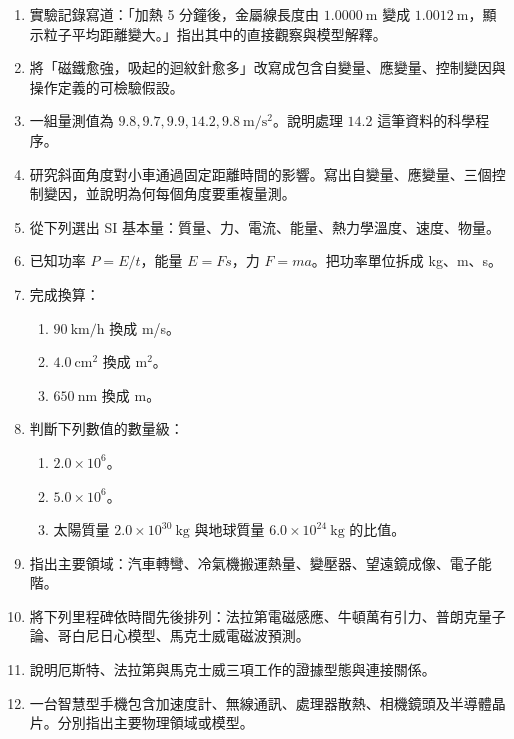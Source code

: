\documentclass[11pt,a4paper]{article}
\providecommand{\tightlist}{%
  \setlength{\itemsep}{0pt}\setlength{\parskip}{0pt}}
\begin{document}
\begin{enumerate}
\def\labelenumi{\arabic{enumi}.}
\item
  實驗記錄寫道：「加熱 5 分鐘後，金屬線長度由 \(1.0000\ \mathrm m\) 變成 \(1.0012\ \mathrm m\)，顯示粒子平均距離變大。」指出其中的直接觀察與模型解釋。
\item
  將「磁鐵愈強，吸起的迴紋針愈多」改寫成包含自變量、應變量、控制變因與操作定義的可檢驗假設。
\item
  一組量測值為 \(9.8,9.7,9.9,14.2,9.8\ \mathrm{m/s^2}\)。說明處理 \(14.2\) 這筆資料的科學程序。
\item
  研究斜面角度對小車通過固定距離時間的影響。寫出自變量、應變量、三個控制變因，並說明為何每個角度要重複量測。
\item
  從下列選出 SI 基本量：質量、力、電流、能量、熱力學溫度、速度、物量。
\item
  已知功率 \(P=E/t\)，能量 \(E=Fs\)，力 \(F=ma\)。把功率單位拆成 kg、m、s。
\item
  完成換算：

  \begin{enumerate}
  \def\labelenumii{(\arabic{enumii})}
  \tightlist
  \item
    \(90\ \mathrm{km/h}\) 換成 m/s。\\
  \item
    \(4.0\ \mathrm{cm^2}\) 換成 \(\mathrm{m^2}\)。\\
  \item
    \(650\ \mathrm{nm}\) 換成 m。
  \end{enumerate}
\item
  判斷下列數值的數量級：

  \begin{enumerate}
  \def\labelenumii{(\arabic{enumii})}
  \tightlist
  \item
    \(2.0\times10^6\)。\\
  \item
    \(5.0\times10^6\)。\\
  \item
    太陽質量 \(2.0\times10^{30}\ \mathrm{kg}\) 與地球質量 \(6.0\times10^{24}\ \mathrm{kg}\) 的比值。
  \end{enumerate}
\item
  指出主要領域：汽車轉彎、冷氣機搬運熱量、變壓器、望遠鏡成像、電子能階。
\item
  將下列里程碑依時間先後排列：法拉第電磁感應、牛頓萬有引力、普朗克量子論、哥白尼日心模型、馬克士威電磁波預測。
\item
  說明厄斯特、法拉第與馬克士威三項工作的證據型態與連接關係。
\item
  一台智慧型手機包含加速度計、無線通訊、處理器散熱、相機鏡頭及半導體晶片。分別指出主要物理領域或模型。
\end{enumerate}
\end{document}
